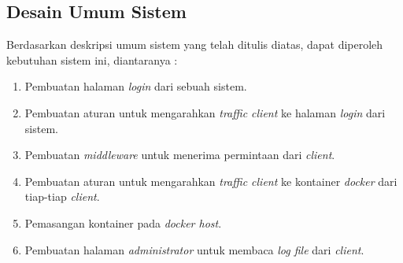     \subsection{Desain Umum Sistem}
      \indent Berdasarkan deskripsi umum sistem yang telah ditulis diatas, dapat diperoleh kebutuhan sistem ini, diantaranya :
        \begin{enumerate}
        \item Pembuatan halaman \textit{login} dari sebuah sistem.
        \item Pembuatan aturan untuk mengarahkan \textit{traffic client} ke halaman \textit{login} dari sistem.
        \item Pembuatan \textit{middleware} untuk menerima permintaan dari \textit{client}.
        \item Pembuatan aturan untuk mengarahkan \textit{traffic client} ke kontainer \textit{docker} dari tiap-tiap \textit{client}.
        \item Pemasangan kontainer pada \textit{docker host}.
        \item Pembuatan halaman \textit{administrator} untuk membaca \textit{log file} dari \textit{client}.
        \end{enumerate} 
      
